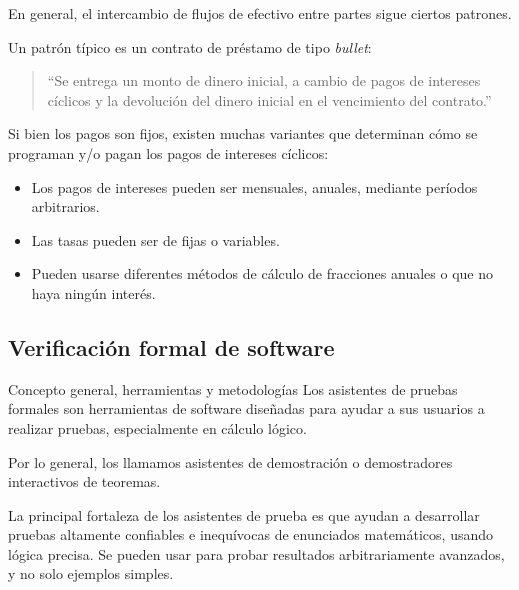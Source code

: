 \documentclass{beamer}
\begin{document}
\begin{frame}
    En general, el intercambio de flujos de efectivo entre partes sigue ciertos patrones. \pause

    Un patrón típico es un contrato de préstamo de tipo \textit{bullet}: \pause

    \medskip

    \begin{quote}
        ``Se entrega un monto de dinero inicial, a cambio de pagos de intereses cíclicos y la devolución del dinero inicial en el vencimiento del contrato.''
    \end{quote}
    \pause
    \medskip

    Si bien los pagos son fijos, existen muchas variantes que determinan cómo se programan y/o pagan los pagos de intereses cíclicos:
    \begin{itemize}
        \pause
        \item Los pagos de intereses pueden ser mensuales, anuales, mediante períodos arbitrarios. 
        \pause
        \item Las tasas pueden ser de fijas o variables.
        \pause
        \item Pueden usarse diferentes métodos de cálculo de fracciones anuales o que no haya ningún interés.
    \end{itemize}



\end{frame}


\subsection{Verificación formal de software}

\begin{frame}{Concepto general, herramientas y metodologías}
Los asistentes de pruebas formales son herramientas de software diseñadas para ayudar a sus usuarios a realizar pruebas, especialmente en cálculo lógico.

\medskip

Por lo general, los llamamos asistentes de demostración o demostradores interactivos de teoremas.

\medskip
\pause

La principal fortaleza de los asistentes de prueba es que ayudan a desarrollar pruebas altamente confiables e inequívocas de enunciados matemáticos, usando lógica precisa. Se pueden usar para probar resultados arbitrariamente avanzados, y no solo ejemplos simples.

\end{frame}
\end{document}
